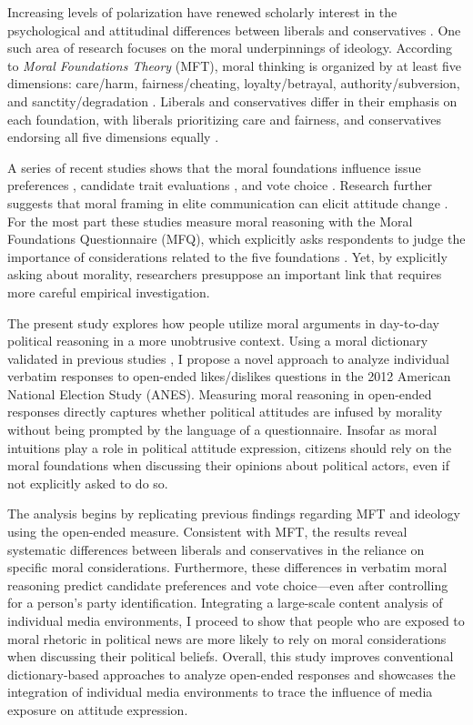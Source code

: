 Increasing levels of polarization have renewed scholarly interest in the psychological and attitudinal differences between liberals and conservatives \citep{jost2006end}. One such area of research focuses on the moral underpinnings of ideology. According to \textit{Moral Foundations Theory} (MFT), moral thinking is organized by at least five dimensions: care/harm, fairness/cheating, loyalty/betrayal, authority/subversion, and sanctity/degradation \citep{graham2013moral}. Liberals and conservatives differ in their emphasis on each foundation, with liberals prioritizing care and fairness, and conservatives endorsing all five dimensions equally \citep{graham2009liberals}.

A series of recent studies shows that the moral foundations influence issue preferences \citep{kertzer2014moral}, candidate trait evaluations \citep{clifford2014linking}, and vote choice \citep{iyer2010beyond}. Research further suggests that moral framing in elite communication can elicit attitude change \citep[e.g.][]{clifford2015concerns,feinberg2013moral}. For the most part these studies measure moral reasoning with the Moral Foundations Questionnaire (MFQ), which explicitly asks respondents to judge the importance of considerations related to the five foundations \citep[e.g.,][]{graham2011mapping}. Yet, by explicitly asking about morality, researchers presuppose an important link that requires more careful empirical investigation.

The present study explores how people utilize moral arguments in day-to-day political reasoning in a more unobtrusive context. Using a moral dictionary validated in previous studies \citep{graham2009liberals}, I propose a novel approach to analyze individual verbatim responses to open-ended likes/dislikes questions in the 2012 American National Election Study (ANES). Measuring moral reasoning in open-ended responses directly captures whether political attitudes are infused by morality without being prompted by the language of a questionnaire. Insofar as moral intuitions play a role in political attitude expression, citizens should rely on the moral foundations when discussing their opinions about political actors, even if not explicitly asked to do so.

The analysis begins by replicating previous findings regarding MFT and ideology using the open-ended measure. Consistent with MFT, the results reveal systematic differences between liberals and conservatives in the reliance on specific moral considerations. Furthermore, these differences in verbatim moral reasoning predict candidate preferences and vote choice---even after controlling for a person's party identification. Integrating a large-scale content analysis of individual media environments, I proceed to show that people who are exposed to moral rhetoric in political news are more likely to rely on moral considerations when discussing their political beliefs. Overall, this study improves conventional dictionary-based approaches to analyze open-ended responses and showcases the integration of individual media environments to trace the influence of media exposure on attitude expression.


